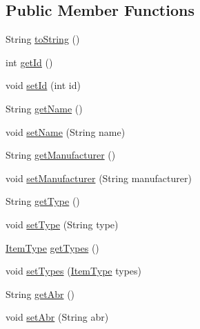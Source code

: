 \subsection*{Public Member Functions}
\begin{DoxyCompactItemize}
\item 
String \mbox{\hyperlink{class_g_u_i_project_1_1_product_ac37c87e9eceda7b1453bbe59b1e20c75}{to\+String}} ()
\item 
int \mbox{\hyperlink{class_g_u_i_project_1_1_product_ae72a50e7c9256c8ffef8c39809d99433}{get\+Id}} ()
\item 
void \mbox{\hyperlink{class_g_u_i_project_1_1_product_a4e64ff0d7cc5846709d34fb3893d8622}{set\+Id}} (int id)
\item 
String \mbox{\hyperlink{class_g_u_i_project_1_1_product_a5d2fc659a459cf83065eaea96e37a3fe}{get\+Name}} ()
\item 
void \mbox{\hyperlink{class_g_u_i_project_1_1_product_a823c9cda222692cfc3581bae16032ffa}{set\+Name}} (String name)
\item 
String \mbox{\hyperlink{class_g_u_i_project_1_1_product_a61fcfd8cc11264f1a31b5c16c18b77ce}{get\+Manufacturer}} ()
\item 
void \mbox{\hyperlink{class_g_u_i_project_1_1_product_a3f89a084e7cd847f793e2999dbfe84c7}{set\+Manufacturer}} (String manufacturer)
\item 
String \mbox{\hyperlink{class_g_u_i_project_1_1_product_a5014b63cd8200fdd0bd65745ed15cbf6}{get\+Type}} ()
\item 
void \mbox{\hyperlink{class_g_u_i_project_1_1_product_a258ba067308d3fd8639a64c5e190bbfb}{set\+Type}} (String type)
\item 
\mbox{\hyperlink{enum_g_u_i_project_1_1_item_type}{Item\+Type}} \mbox{\hyperlink{class_g_u_i_project_1_1_product_a7b6a8245f27af140c01d24dc47b591d1}{get\+Types}} ()
\item 
void \mbox{\hyperlink{class_g_u_i_project_1_1_product_aea49404489bdc6234cb838d6a8151bd4}{set\+Types}} (\mbox{\hyperlink{enum_g_u_i_project_1_1_item_type}{Item\+Type}} types)
\item 
String \mbox{\hyperlink{class_g_u_i_project_1_1_product_a09a96298af0d886657d9badd38dd8dca}{get\+Abr}} ()
\item 
void \mbox{\hyperlink{class_g_u_i_project_1_1_product_aa61085427c21c7acf8498243e4b17729}{set\+Abr}} (String abr)
\end{DoxyCompactItemize}
